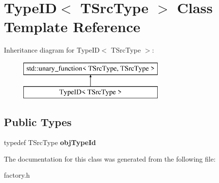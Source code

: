 \hypertarget{class_type_i_d}{\section{Type\+I\+D$<$ T\+Src\+Type $>$ Class Template Reference}
\label{class_type_i_d}
}
Inheritance diagram for Type\+I\+D$<$ T\+Src\+Type $>$\+:\begin{figure}[H]
\begin{center}
\leavevmode
\includegraphics[height=2.000000cm]{class_type_i_d}
\end{center}
\end{figure}
\subsection*{Public Types}
\begin{DoxyCompactItemize}
\item 
\hypertarget{class_type_i_d_a23939ce1de2506649cf34e28fc35cb8b}{typedef T\+Src\+Type {\bfseries obj\+Type\+Id}}\label{class_type_i_d_a23939ce1de2506649cf34e28fc35cb8b}

\end{DoxyCompactItemize}


The documentation for this class was generated from the following file\+:\begin{DoxyCompactItemize}
\item 
factory.\+h\end{DoxyCompactItemize}
